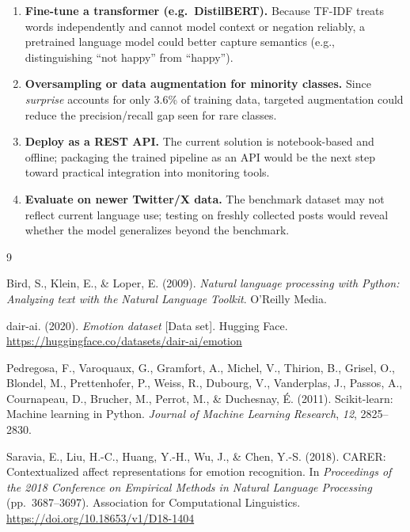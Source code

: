 \documentclass[12pt]{article}
\begin{document}
\begin{enumerate}
    \item \textbf{Fine-tune a transformer (e.g.\ DistilBERT).}
    Because TF-IDF treats words independently and cannot model context or negation reliably, a pretrained language model could better capture semantics (e.g., distinguishing ``not happy'' from ``happy'').
    \item \textbf{Oversampling or data augmentation for minority classes.}
    Since \textit{surprise} accounts for only 3.6\% of training data, targeted augmentation could reduce the precision/recall gap seen for rare classes.
    \item \textbf{Deploy as a REST API.}
    The current solution is notebook-based and offline; packaging the trained pipeline as an API would be the next step toward practical integration into monitoring tools.
    \item \textbf{Evaluate on newer Twitter/X data.}
    The benchmark dataset may not reflect current language use; testing on freshly collected posts would reveal whether the model generalizes beyond the benchmark.
\end{enumerate}

\begin{thebibliography}{9}

Bird, S., Klein, E., \& Loper, E. (2009).
\textit{Natural language processing with Python: Analyzing text with the Natural Language Toolkit}.
O'Reilly Media.

dair-ai. (2020). \textit{Emotion dataset} [Data set]. Hugging Face.
\url{https://huggingface.co/datasets/dair-ai/emotion}

Pedregosa, F., Varoquaux, G., Gramfort, A., Michel, V., Thirion, B., Grisel, O., Blondel, M., Prettenhofer, P., Weiss, R., Dubourg, V., Vanderplas, J., Passos, A., Cournapeau, D., Brucher, M., Perrot, M., \& Duchesnay, \'E. (2011).
Scikit-learn: Machine learning in Python.
\textit{Journal of Machine Learning Research}, \textit{12}, 2825--2830.

Saravia, E., Liu, H.-C., Huang, Y.-H., Wu, J., \& Chen, Y.-S. (2018).
CARER: Contextualized affect representations for emotion recognition.
In \textit{Proceedings of the 2018 Conference on Empirical Methods in Natural Language Processing} (pp.\ 3687--3697).
Association for Computational Linguistics.
\url{https://doi.org/10.18653/v1/D18-1404}

\end{thebibliography}
\end{document}

